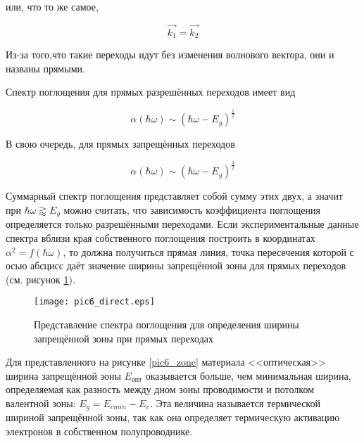 или, что то же самое,

\begin{equation}
\overrightarrow{k_{1}} = \overrightarrow{k_{2}}
\end{equation}

Из-за того,что такие переходы идут без изменения волнового вектора, они и названы прямыми.

Спектр поглощения для прямых разрешённых переходов имеет вид

\begin{equation}
\alpha(\hbar \omega) \sim (\hbar \omega - E_{g})^{\frac{1}{2}}
\end{equation}

В свою очередь, для прямых запрещённых переходов

\begin{equation}
\alpha(\hbar \omega) \sim (\hbar \omega - E_{g})^{\frac{3}{2}}
\end{equation}

Суммарный спектр поглощения представляет собой сумму этих двух, а значит при $\hbar \omega \gtrapprox E_{g}$ можно считать, что зависимость коэффициента поглощения определяется только разрешёнными переходами. Если экспериментальные данные спектра вблизи края собственного поглощения построить в координатах $\alpha^2 = f(\hbar \omega)$, то должна получиться прямая линия, точка пересечения которой с осью абсцисс даёт значение ширины запрещённой зоны для прямых переходов (см. рисунок \ref{pic6_direct}).

\begin{figure}[h!]\centering
\texttt{[image: pic6\_direct.eps]}
\caption{Представление спектра поглощения для определения ширины запрещённой зоны при прямых переходах}
\label{pic6_direct}
\end{figure}

Для представленного на рисунке \ref{pic6_zone} материала <<оптическая>> ширина запрещённой зоны $E_{\text{опт}}$ оказывается больше, чем минимальная ширина, определяемая как разность между дном зоны проводимости и потолком валентной зоны: $E_{g} = E_{c min} - E_{v}$. Эта величина называется термической шириной запрещённой зоны, так как она определяет термическую активацию электронов в собственном полупроводнике.


